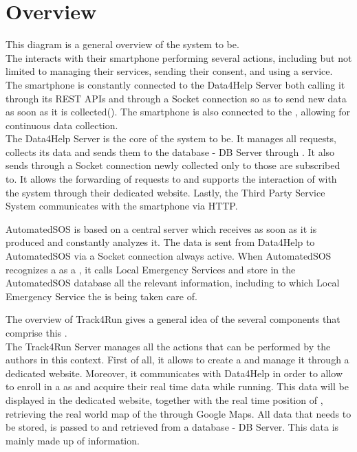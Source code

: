 \documentclass[../../DD.tex]{subfiles}
\begin{document}
\section{Overview}

	This diagram is a general overview of the system to be.\\
	The  interacts with their smartphone performing several actions, including but not limited to managing their services, sending their consent, and using a service. The smartphone is constantly connected to the Data4Help Server both calling it through its REST APIs and through a Socket connection so as to send new data as soon as it is collected(). The smartphone is also connected to the , allowing for continuous data collection.\\
	The Data4Help Server is the core of the system to be. It manages all  requests, collects its data and sends them to the database - DB Server through . It also sends through a Socket connection newly collected  only to those  are subscribed to. It allows the forwarding of  requests to  and supports the interaction of  with the system through their dedicated website.
	Lastly, the Third Party Service System communicates with the  smartphone via HTTP. 



	AutomatedSOS is based on a central server which receives  as soon as it is produced and constantly analyzes it. The data is sent from Data4Help to AutomatedSOS via a Socket connection always active. When AutomatedSOS recognizes a  as a , it calls Local Emergency Services and store in the AutomatedSOS database all the relevant information, including to which Local Emergency Service the  is being taken care of.



	The overview of Track4Run gives a general idea of the several components that comprise this .\\
	The Track4Run Server manages all the actions that can be performed by the authors in this context. First of all, it allows  to create a  and manage it through a dedicated website. Moreover, it communicates with Data4Help in order to allow  to enroll in a  as  and acquire their real time data while running. This data will be displayed in the dedicated  website, together with the real time position of , retrieving the real world map of the  through Google Maps. All data that needs to be stored, is passed to and retrieved from a database - DB Server. This data is mainly made up of  information.

	

	
\end{document}
